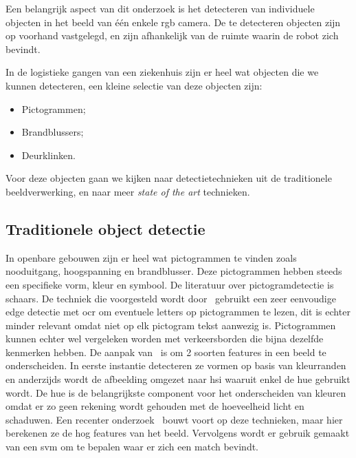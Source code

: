         Een belangrijk aspect van dit onderzoek is het detecteren van individuele objecten in het beeld van \'{e}\'{e}n enkele \gls{rgb} camera.
        De te detecteren objecten zijn op voorhand vastgelegd, en zijn afhankelijk van de ruimte waarin de robot zich bevindt.

        In de logistieke gangen van een ziekenhuis zijn er heel wat objecten die we kunnen detecteren, een kleine selectie van deze objecten zijn:

        \begin{itemize}
            \item Pictogrammen;
            \item Brandblussers;
            \item Deurklinken.
        \end{itemize}

        Voor deze objecten gaan we kijken naar detectietechnieken uit de traditionele beeldverwerking, en naar meer \textit{state of the art} technieken. 


        \subsection{Traditionele object detectie} \label{sec:trad_obj_det}
            In openbare gebouwen zijn er heel wat pictogrammen te vinden zoals nooduitgang, hoogspanning en brandblusser. Deze pictogrammen hebben steeds een specifieke vorm, kleur en symbool.
            De literatuur over pictogramdetectie is schaars. De techniek die voorgesteld wordt door~\cite{swathika2016} gebruikt een zeer eenvoudige edge detectie met \gls{ocr} om eventuele letters op pictogrammen te lezen, dit is echter minder relevant omdat niet op elk pictogram tekst aanwezig is. Pictogrammen kunnen echter wel vergeleken worden met verkeersborden die bijna dezelfde kenmerken hebben.
            De aanpak van~\cite{Fang2003} is om 2 soorten features in een beeld te onderscheiden. In eerste instantie detecteren ze vormen op basis van kleurranden en anderzijds wordt de
            afbeelding omgezet naar \gls{hsi} waaruit enkel de hue gebruikt wordt. De hue is de belangrijkste component voor het onderscheiden van kleuren omdat er zo geen rekening wordt gehouden
            met de hoeveelheid licht en schaduwen.
            Een recenter onderzoek~\cite{Zabihi2017} bouwt voort op deze technieken,
            maar hier berekenen ze de \gls{hog} features van het beeld. Vervolgens wordt er gebruik gemaakt van een \gls{svm} om te bepalen waar er zich een match bevindt.

